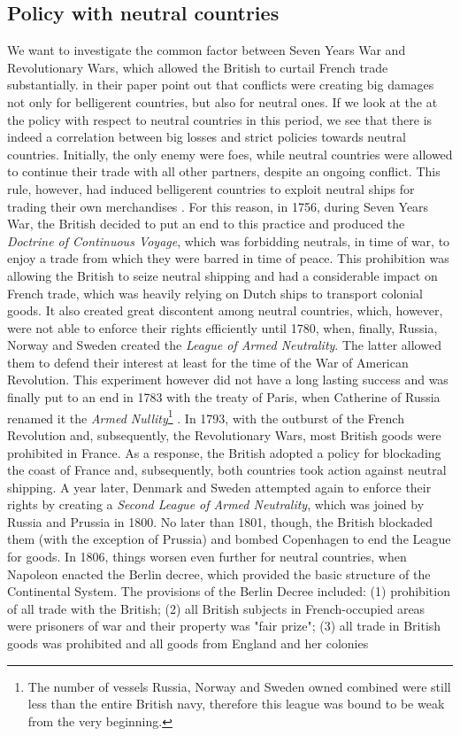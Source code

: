 \documentclass[12pt,a4paper,notitlepage,english]{article}
\begin{document}
\subsection{Policy with neutral countries}
We want to investigate the common factor between Seven Years War and Revolutionary Wars, which allowed the British to curtail French trade substantially. \cite{glick2010collateral} in their paper point out that conflicts were creating big damages not only for belligerent countries, but also for neutral ones. If we look at the at the policy with respect to neutral countries in this period, we see that there is indeed a correlation between big losses and strict policies towards neutral countries. 
Initially, the only enemy were foes, while neutral countries were allowed to continue their trade with all other partners, despite an ongoing conflict. This rule, however, had induced belligerent countries to exploit neutral ships for trading their own merchandises \citep{carriere1973negociants}. For this reason, in 1756, during Seven Years War, the British decided to put an end to this practice and produced the \textit{Doctrine of Continuous Voyage}, which was forbidding neutrals, in time of war, to enjoy a trade from which they were barred in time of peace. This prohibition was allowing the British to seize neutral shipping and had a considerable impact on French trade, which was heavily relying on Dutch ships to transport colonial goods. It also created great discontent among neutral countries, which, however, were not able to enforce their rights efficiently until 1780, when, finally, Russia, Norway and Sweden created the \textit{League of Armed Neutrality}. The latter allowed them to defend their interest at least for the time of the War of American Revolution. This experiment however did not have a long lasting success and was finally put to an end in 1783 with the treaty of Paris, when Catherine of Russia renamed it the \textit{Armed Nullity}\footnote{The number of vessels Russia, Norway and Sweden owned combined were still less than the entire British navy, therefore this league was bound to be weak from the very beginning.} \citep{griffiths1971american}. In 1793, with the outburst of the French Revolution and, subsequently, the Revolutionary Wars, most British goods were prohibited in France. As a response, the British adopted a policy for blockading the coast of France and, subsequently, both countries took action against neutral shipping. A year later, Denmark and Sweden attempted again to enforce their rights by creating a \textit{Second League of Armed Neutrality}, which was joined by Russia and Prussia in 1800. No later than 1801, though, the British blockaded them (with the exception of Prussia) and bombed Copenhagen to end the League for goods. In 1806, things worsen even further for neutral countries, when Napoleon enacted the Berlin decree, which provided the basic structure of the Continental System. The provisions of the Berlin Decree included: (1) prohibition of all trade with the British; (2) all British subjects in French-occupied areas were prisoners of war and their property was "fair prize"; (3) all trade in British goods was prohibited and all goods from England and her colonies 
\end{document}
